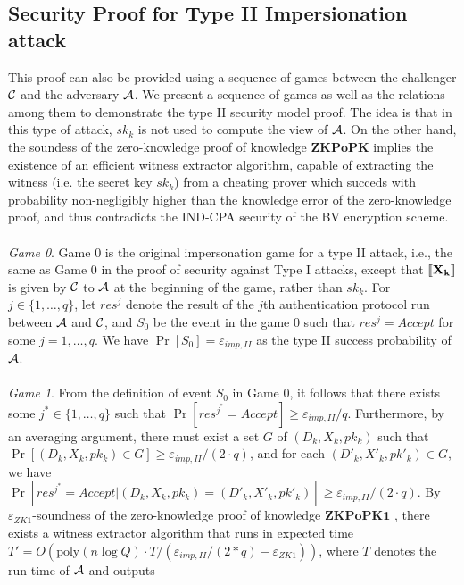 \subsection{Security Proof for Type II Impersionation attack}
\label{append:ProofsTypeII}
This proof can also be provided using a sequence of games between the challenger
$\mathcal{C}$ and the adversary $\mathcal{A}$. We present a sequence of games as
well as the relations among them to demonstrate the type II security model
proof. The idea is that in this type of attack, $sk_k$ is not used to compute
the view of $\mathcal{A}$.  On the other hand, the soundess of the zero-knowledge
proof of knowledge $\mathbf{ZKPoPK}$ implies the existence of an efficient
witness extractor algorithm, capable of extracting the witness (i.e. the
secret key $sk_k$) from a cheating prover which succeds with probability
non-negligibly higher than the knowledge error of the zero-knowledge proof, and thus
contradicts the IND-CPA security of the BV encryption scheme.
\\\\
\textit{Game 0}. Game 0 is the original impersonation game for a type II attack,
i.e., the same as Game 0 in the proof of security against Type I attacks, except
that $\left\llbracket\mathbf{X_{k}}\right\rrbracket$ is given by $\mathcal{C}$ to $\mathcal{A}$ at the
beginning of the game, rather than $sk_k$.  For $j \in \{1,\ldots,q\}$, let
$res^{j}$ denote the result of the $j$th authentication protocol run between
$\mathcal{A}$ and $\mathcal{C}$, and $S_0$ be
the event in the game $0$ such that $res^{j} = Accept$ for some $j=1,\ldots,q$. We have $\Pr[S_0] = \varepsilon_{imp,II}$ as the type II success probability of $\mathcal{A}$. \\\\
\textit{Game 1}. From the definition of event $S_0$ in Game 0, it follows that
there exists some $j^* \in \{1,\ldots,q\}$ such that
$\Pr[res^{j^*} = Accept] \geq \varepsilon_{imp,II}/q$. Furthermore, by an
averaging argument, there must exist a set $G$ of $(D_k,X_k,pk_k)$ such that
$\Pr[(D_k,X_k,pk_k) \in G] \geq \varepsilon_{imp,II}/(2 \cdot q)$, and for each
$(D'_k,X'_k,pk'_k) \in G$, we have
$\Pr[res^{j^*} = Accept |(D_k,X_k,pk_k)=(D'_k,X'_k,pk'_k)] \geq
\varepsilon_{imp,II}/(2 \cdot q)$. By $\varepsilon_{ZK1}$-soundness of the
zero-knowledge proof of knowledge $\mathbf{ZKPoPK1}$
\cite{goldreich2009foundations}, there exists a witness extractor algorithm that
runs in expected time
$T'=O(\mathrm{poly}(n \log Q) \cdot T / (\varepsilon_{imp,II}/(2*q) -
\varepsilon_{ZK1}))$, where $T$ denotes the run-time of $\mathcal{A}$ and outputs
